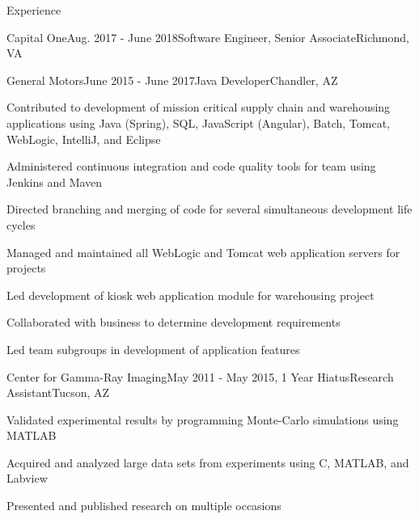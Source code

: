 \documentclass{resume} %
\begin{document}
\begin{rSection}{Experience}
\begin{rSubsection}{Capital One}{Aug. 2017 - June 2018}{Software Engineer, Senior Associate}{Richmond, VA}
\end{rSubsection}

\begin{rSubsection}{General Motors}{June 2015 - June 2017}{Java Developer}{Chandler, AZ}

\setlength{\itemindent}{.0in}\item 
Contributed to development of mission critical supply chain and warehousing applications using
\newline
Java (Spring), SQL, JavaScript (Angular), Batch, Tomcat, WebLogic, IntelliJ, and Eclipse
\setlength{\itemindent}{.0in}\item
Administered continuous integration and code quality tools for team using Jenkins and Maven
\setlength{\itemindent}{.0in}\item
Directed branching and merging of code for several simultaneous development life cycles
\setlength{\itemindent}{.0in}\item
Managed and maintained all WebLogic and Tomcat web application servers for projects
\setlength{\itemindent}{.0in}\item
Led development of kiosk web application module for warehousing project
\setlength{\itemindent}{.0in}\item
Collaborated with business to determine development requirements
\setlength{\itemindent}{.0in}\item
Led team subgroups in development of application features

\end{rSubsection}


\begin{rSubsection}{Center for Gamma-Ray Imaging}{May 2011 - May 2015, 1 Year Hiatus}{Research Assistant}{Tucson, AZ}
\item Validated experimental results by programming Monte-Carlo simulations using MATLAB
\item Acquired and analyzed large data sets from experiments using C, MATLAB, and Labview 
\item Presented and published research on multiple occasions

\end{rSubsection}

\end{rSection}

\end{document}
